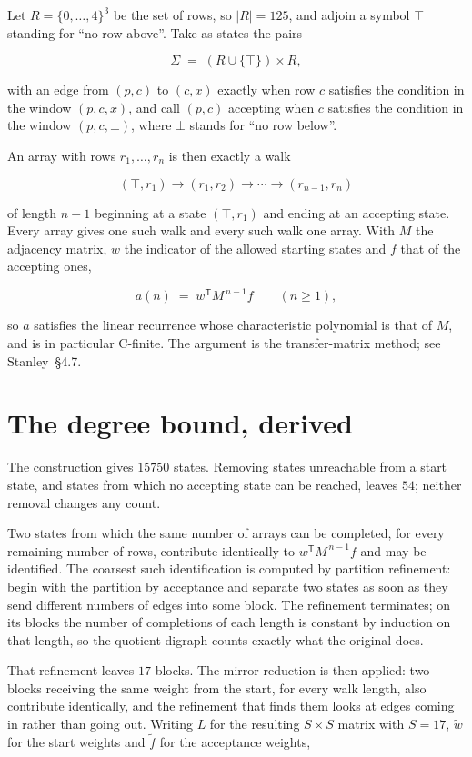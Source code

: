\documentclass[11pt]{article}
\theoremstyle{definition}
\begin{document}
Let $R = \{0,\dots,4\}^{3}$ be the set of rows, so $|R| = 125$, and adjoin a symbol $\top$ standing for ``no row above''. Take as states the pairs

\[\Sigma \;=\; (R \cup \{\top\}) \times R,\]

with an edge from $(p,c)$ to $(c,x)$ exactly when row $c$ satisfies the condition in the window $(p,c,x)$, and call $(p,c)$ accepting when $c$ satisfies the condition in the window $(p,c,\bot)$, where $\bot$ stands for ``no row below''.

An array with rows $r_1,\dots,r_n$ is then exactly a walk

\[(\top,r_1) \to (r_1,r_2) \to \cdots \to (r_{n-1},r_n)\]

of length $n-1$ beginning at a state $(\top,r_1)$ and ending at an accepting state. Every array gives one such walk and every such walk one array. With $M$ the adjacency matrix, $w$ the indicator of the allowed starting states and $f$ that of the accepting ones,

\[a(n) \;=\; w^{\mathsf T} M^{\,n-1} f \qquad (n \ge 1),\]

so $a$ satisfies the linear recurrence whose characteristic polynomial is that of $M$, and is in particular C-finite. The argument is the transfer-matrix method; see Stanley~\S4.7.

\section{The degree bound, derived}

The construction gives $15750$ states. Removing states unreachable from a start state, and states from which no accepting state can be reached, leaves $54$; neither removal changes any count.

Two states from which the same number of arrays can be completed, for every remaining number of rows, contribute identically to $w^{\mathsf T}M^{\,n-1}f$ and may be identified. The coarsest such identification is computed by partition refinement: begin with the partition by acceptance and separate two states as soon as they send different numbers of edges into some block. The refinement terminates; on its blocks the number of completions of each length is constant by induction on that length, so the quotient digraph counts exactly what the original does.

That refinement leaves $17$ blocks. The mirror reduction is then applied: two blocks receiving the same weight from the start, for every walk length, also contribute identically, and the refinement that finds them looks at edges coming in rather than going out. Writing $L$ for the resulting $S \times S$ matrix with $S = 17$, $\tilde w$ for the start weights and $\tilde f$ for the acceptance weights,
\end{document}
